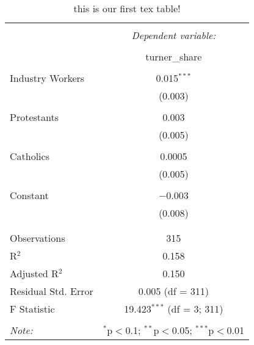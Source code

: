 
\begin{table}[!htbp] \centering 
  \caption{this is our first tex table!} 
  \label{} 
\begin{tabular}{@{\extracolsep{5pt}}lc} 
\\[-1.8ex]\hline 
\hline \\[-1.8ex] 
 & \multicolumn{1}{c}{\textit{Dependent variable:}} \\ 
\cline{2-2} 
\\[-1.8ex] & turner\_share \\ 
\hline \\[-1.8ex] 
 Industry Workers & 0.015$^{***}$ \\ 
  & (0.003) \\ 
  & \\ 
 Protestants & 0.003 \\ 
  & (0.005) \\ 
  & \\ 
 Catholics & 0.0005 \\ 
  & (0.005) \\ 
  & \\ 
 Constant & $-$0.003 \\ 
  & (0.008) \\ 
  & \\ 
\hline \\[-1.8ex] 
Observations & 315 \\ 
R$^{2}$ & 0.158 \\ 
Adjusted R$^{2}$ & 0.150 \\ 
Residual Std. Error & 0.005 (df = 311) \\ 
F Statistic & 19.423$^{***}$ (df = 3; 311) \\ 
\hline 
\hline \\[-1.8ex] 
\textit{Note:}  & \multicolumn{1}{r}{$^{*}$p$<$0.1; $^{**}$p$<$0.05; $^{***}$p$<$0.01} \\ 
\end{tabular} 
\end{table} 
